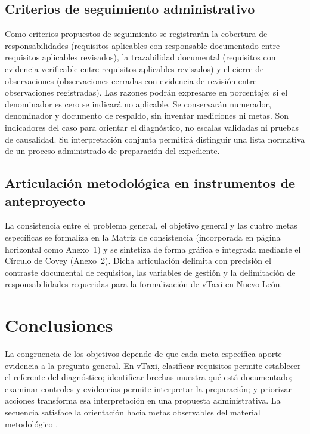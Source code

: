 {\subsection{Criterios de seguimiento administrativo}
Como criterios propuestos de seguimiento se registrarán la cobertura de responsabilidades (requisitos aplicables con responsable documentado entre requisitos aplicables revisados), la trazabilidad documental (requisitos con evidencia verificable entre requisitos aplicables revisados) y el cierre de observaciones (observaciones cerradas con evidencia de revisión entre observaciones registradas). Las razones podrán expresarse en porcentaje; si el denominador es cero se indicará no aplicable. Se conservarán numerador, denominador y documento de respaldo, sin inventar mediciones ni metas. Son indicadores del caso para orientar el diagnóstico, no escalas validadas ni pruebas de causalidad. Su interpretación conjunta permitirá distinguir una lista normativa de un proceso administrado de preparación del expediente.

\subsection{Articulación metodológica en instrumentos de anteproyecto}
La consistencia entre el problema general, el objetivo general y las cuatro metas específicas se formaliza en la Matriz de consistencia (incorporada en página horizontal como Anexo~1) y se sintetiza de forma gráfica e integrada mediante el Círculo de Covey (Anexo~2). Dicha articulación delimita con precisión el contraste documental de requisitos, las variables de gestión y la delimitación de responsabilidades requeridas para la formalización de vTaxi en Nuevo León.

\clearpage\section{Conclusiones}

La congruencia de los objetivos depende de que cada meta específica aporte evidencia a la pregunta general. En vTaxi, clasificar requisitos permite establecer el referente del diagnóstico; identificar brechas muestra qué está documentado; examinar controles y evidencias permite interpretar la preparación; y priorizar acciones transforma esa interpretación en una propuesta administrativa. La secuencia satisface la orientación hacia metas observables del material metodológico .

}
